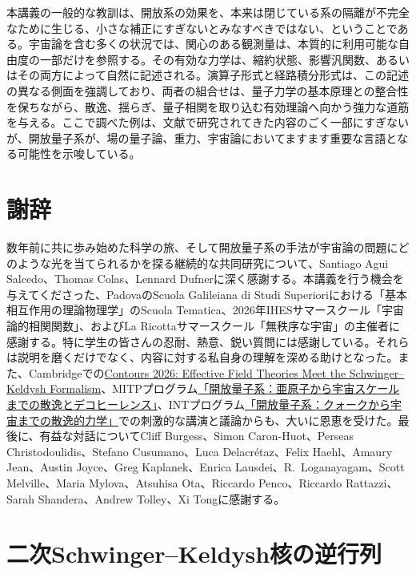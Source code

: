 \documentclass[a4paper,11pt,oneside]{article}
\theoremstyle{definition}
\numberwithin{equation}{section}
\begin{document}
本講義の一般的な教訓は、開放系の効果を、本来は閉じている系の隔離が不完全なために生じる、小さな補正にすぎないとみなすべきではない、ということである。宇宙論を含む多くの状況では、関心のある観測量は、本質的に利用可能な自由度の一部だけを参照する。その有効な力学は、縮約状態、影響汎関数、あるいはその両方によって自然に記述される。演算子形式と経路積分形式は、この記述の異なる側面を強調しており、両者の組合せは、量子力学の基本原理との整合性を保ちながら、散逸、揺らぎ、量子相関を取り込む有効理論へ向かう強力な道筋を与える。ここで調べた例は、文献で研究されてきた内容のごく一部にすぎないが、開放量子系が、場の量子論、重力、宇宙論においてますます重要な言語となる可能性を示唆している。






\section*{謝辞} 数年前に共に歩み始めた科学の旅、そして開放量子系の手法が宇宙論の問題にどのような光を当てられるかを探る継続的な共同研究について、Santiago Agui Salcedo、Thomas Colas、Lennard Dufnerに深く感謝する。本講義を行う機会を与えてくださった、PadovaのScuola Galileiana di Studi Superioriにおける「基本相互作用の理論物理学」のScuola Tematica、2026年IHESサマースクール「宇宙論的相関関数」、およびLa Ricottaサマースクール「無秩序な宇宙」の主催者に感謝する。特に学生の皆さんの忍耐、熱意、鋭い質問には感謝している。それらは説明を磨くだけでなく、内容に対する私自身の理解を深める助けとなった。また、Cambridgeでの\href{https://indico.global/event/16432/}{Contours 2026: Effective Field Theories Meet the Schwinger--Keldysh Formalism}、MITPプログラム\href{https://indico.mitp.uni-mainz.de/event/436/}{「開放量子系：亜原子から宇宙スケールまでの散逸とデコヒーレンス」}、INTプログラム\href{https://www.int.washington.edu/programs-and-workshops/25-3b}{「開放量子系：クォークから宇宙までの散逸的力学」}での刺激的な講演と議論からも、大いに恩恵を受けた。最後に、有益な対話についてCliff Burgess、Simon Caron-Huot、Perseas Christodoulidis、Stefano Cusumano、Luca Delacr\'etaz、Felix Haehl、Amaury Jean、Austin Joyce、Greg Kaplanek、Enrica Lausdei、R.~Loganayagam、Scott Melville、Maria Mylova、Atsuhisa Ota、Riccardo Penco、Riccardo Rattazzi、Sarah Shandera、Andrew Tolley、Xi Tongに感謝する。




\appendix





\section{二次Schwinger--Keldysh核の逆行列}\label{appA}
\end{document}
